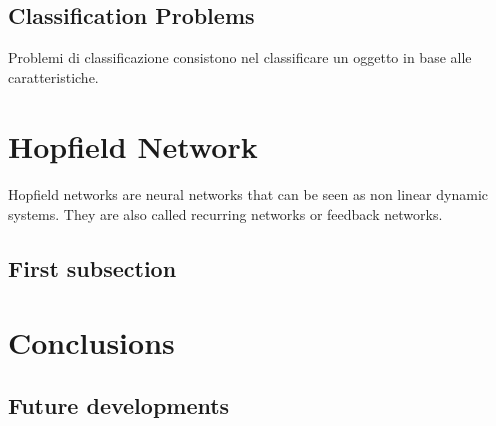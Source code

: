 \documentclass[letterpaper,twocolumn,10pt]{article}
\begin{document}
\subsection{Classification Problems}
Problemi di classificazione consistono nel classificare un oggetto in base alle caratteristiche.
\paragraph{}


\section{Hopfield Network}
\paragraph{}
Hopfield networks are neural networks that can be seen as non linear dynamic systems. They are also called recurring networks or feedback networks. 

\subsection{First subsection}
\paragraph{}



\section{Conclusions}
\paragraph{}

\subsection{Future developments}
\paragraph{}
\cite{example} 
\end{document}
